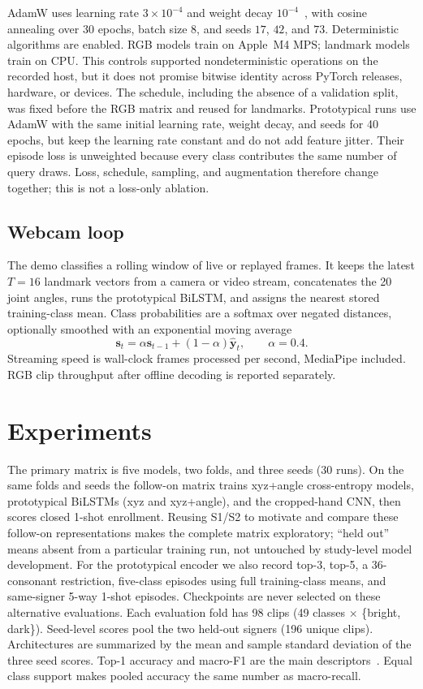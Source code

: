 \documentclass[11pt,a4paper]{article}
\begin{document}
AdamW uses learning rate $3 \times 10^{-4}$ and weight decay $10^{-4}$~\cite{loshchilov2019adamw}, with cosine annealing over 30 epochs, batch size 8, and seeds $17$, $42$, and $73$. Deterministic algorithms are enabled. RGB models train on Apple~M4 MPS; landmark models train on CPU. This controls supported nondeterministic operations on the recorded host, but it does not promise bitwise identity across PyTorch releases, hardware, or devices. The schedule, including the absence of a validation split, was fixed before the RGB matrix and reused for landmarks. Prototypical runs use AdamW with the same initial learning rate, weight decay, and seeds for 40 epochs, but keep the learning rate constant and do not add feature jitter. Their episode loss is unweighted because every class contributes the same number of query draws. Loss, schedule, sampling, and augmentation therefore change together; this is not a loss-only ablation.

\subsection{Webcam loop}

The demo classifies a rolling window of live or replayed frames. It keeps the latest $T=16$ landmark vectors from a camera or video stream, concatenates the 20 joint angles, runs the prototypical BiLSTM, and assigns the nearest stored training-class mean. Class probabilities are a softmax over negated distances, optionally smoothed with an exponential moving average
\begin{equation}
\mathbf{s}_t = \alpha \mathbf{s}_{t-1} + (1-\alpha)\hat{\mathbf{y}}_t, \qquad \alpha = 0.4.
\end{equation}
Streaming speed is wall-clock frames processed per second, MediaPipe included. RGB clip throughput after offline decoding is reported separately.

\section{Experiments}

The primary matrix is five models, two folds, and three seeds (30 runs). On the same folds and seeds the follow-on matrix trains xyz+angle cross-entropy models, prototypical BiLSTMs (xyz and xyz+angle), and the cropped-hand CNN, then scores closed 1-shot enrollment. Reusing S1/S2 to motivate and compare these follow-on representations makes the complete matrix exploratory; ``held out'' means absent from a particular training run, not untouched by study-level model development. For the prototypical encoder we also record top-3, top-5, a 36-consonant restriction, five-class episodes using full training-class means, and same-signer 5-way 1-shot episodes. Checkpoints are never selected on these alternative evaluations. Each evaluation fold has 98 clips (49 classes $\times$ \{bright, dark\}). Seed-level scores pool the two held-out signers (196 unique clips). Architectures are summarized by the mean and sample standard deviation of the three seed scores. Top-1 accuracy and macro-F1 are the main descriptors~\cite{sokolova2009measures}. Equal class support makes pooled accuracy the same number as macro-recall.
\end{document}
